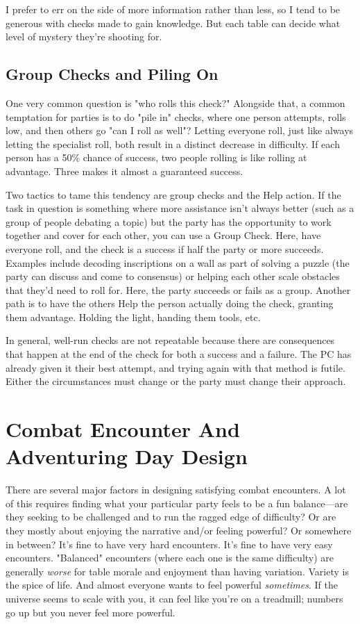 \documentclass[10pt,twoside,openany,bg=none]{dndbook}
\begin{document}
I prefer to err on the side of more information rather than less, so I tend to be generous with checks made to gain knowledge. But each table can decide what level of mystery they're shooting for.

\subsection{Group Checks and Piling On}
One very common question is "who rolls this check?" Alongside that, a common temptation for parties is to do "pile in" checks, where one person attempts, rolls low, and then others go "can I roll as well"? Letting everyone roll, just like always letting the specialist roll, both result in a distinct decrease in difficulty. If each person has a 50\% chance of success, two people rolling is like rolling at advantage. Three makes it almost a guaranteed success.

Two tactics to tame this tendency are group checks and the Help action. If the task in question is something where more assistance isn't always better (such as a group of people debating a topic) but the party has the opportunity to work together and cover for each other, you can use a Group Check. Here, have everyone roll, and the check is a success if half the party or more succeeds. Examples include decoding inscriptions on a wall as part of solving a puzzle (the party can discuss and come to consensus) or helping each other scale obstacles that they'd need to roll for. Here, the party succeeds or fails as a group. Another path is to have the others Help the person actually doing the check, granting them advantage. Holding the light, handing them tools, etc.

In general, well-run checks are not repeatable because there are consequences that happen at the end of the check for both a success and a failure. The PC has already given it their best attempt, and trying again with that method is futile. Either the circumstances must change or the party must change their approach.

\section{Combat Encounter And Adventuring Day Design}\label{sec:encounter-design}
There are several major factors in designing satisfying combat encounters. A lot of this requires finding what your particular party feels to be a fun balance---are they seeking to be challenged and to run the ragged edge of difficulty? Or are they mostly about enjoying the narrative and/or feeling powerful? Or somewhere in between? It's fine to have very hard encounters. It's fine to have very easy encounters. "Balanced" encounters (where each one is the same difficulty) are generally \textit{worse} for table morale and enjoyment than having variation. Variety is the spice of life. And almost everyone wants to feel powerful \textit{sometimes}. If the universe seems to scale with you, it can feel like you're on a treadmill; numbers go up but you never feel more powerful.
\end{document}
